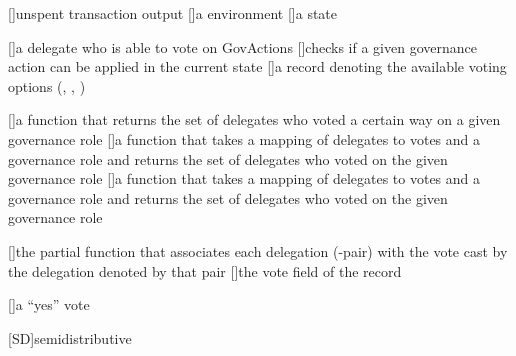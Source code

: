 [\protect{}]{unspent transaction output}
[\protect{}]{a \utxo environment}
[\protect{}]{a \utxo state}

[\protect{}]{a delegate who is able to vote on \acsp{GovAction}}
[\protect{}]{checks if a given governance action can be applied in the current state}
[\protect{}]{a record denoting the available voting options (\yes, \no, \abstain)}

[\protect{}]{a function that returns the set of delegates who voted a certain way on a given governance role}
[\protect{}]{a function that takes a mapping of delegates to votes and a governance role and returns the set of delegates who voted \yes on the given governance role}
[\protect{}]{a function that takes a mapping of delegates to votes and a governance role and returns the set of delegates who voted \abstain on the given governance role}

[\protect{}]{the partial function that associates each delegation (\GovRole-\Credential pair) with the vote cast by the delegation denoted by that pair}
[\protect{}]{the vote field of the \GovVote record}

[\protect{}]{a ``yes'' vote}






[SD]{semidistributive}
